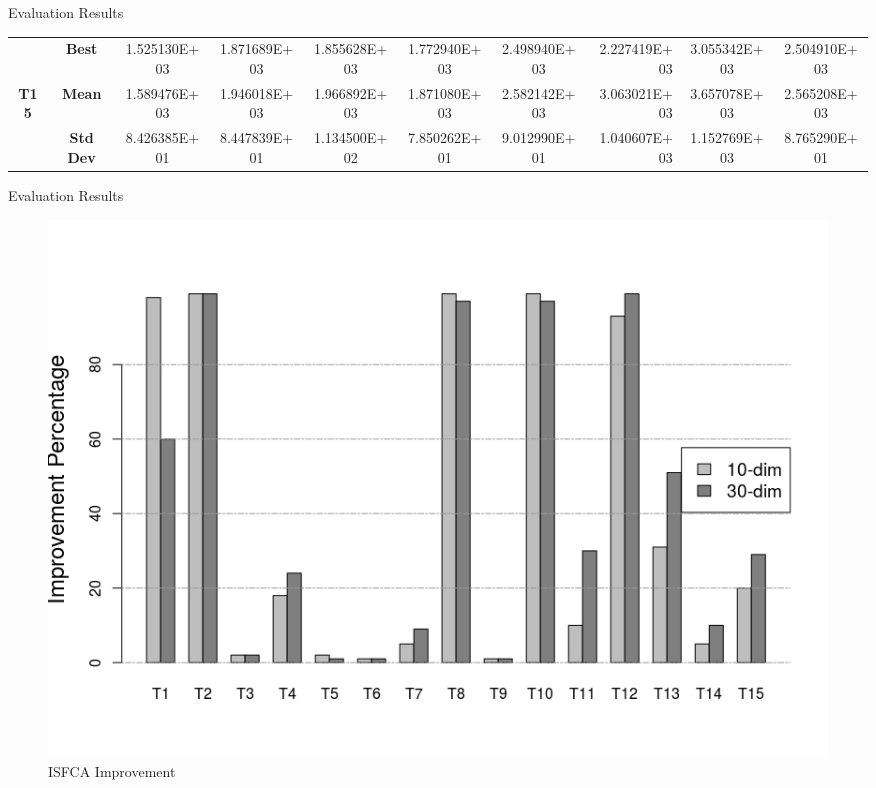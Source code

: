 \documentclass[table]{beamer}
\begin{document}
\begin{frame}{Evaluation Results}
\begin{table}[htbp]
{\begin{tabular}{|c|c|c|c|c|c|c|r|c|c|}
				\multicolumn{ 1}{|c|}{} & \textbf{Best} & 1.525130E+03 & 1.871689E+03 & 1.855628E+03 & 1.772940E+03 & 2.498940E+03 & 2.227419E+03 & 3.055342E+03 & 2.504910E+03 \\ \cline{ 2- 10}
				\multicolumn{ 1}{|c|}{\textbf{T15}} & \textbf{Mean} & 1.589476E+03 & 1.946018E+03 & 1.966892E+03 & 1.871080E+03 & 2.582142E+03 & 3.063021E+03 & 3.657078E+03 & 2.565208E+03 \\ \cline{ 2- 10}
				\multicolumn{ 1}{|c|}{} & \textbf{Std Dev} & 8.426385E+01 & 8.447839E+01 & 1.134500E+02 & 7.850262E+01 & 9.012990E+01 & 1.040607E+03 & 1.152769E+03 & 8.765290E+01 \\ \hline
			\end{tabular}}
			\label{}
		\end{table}
	\end{frame}
	
	\begin{frame}{Evaluation Results}
		\begin{figure}[v]
			\includegraphics[scale=0.43]{percent_I}
			\centering
			\caption{ISFCA Improvement}
			\label{ref:percent_i}
		\end{figure}
	\end{frame}
\end{document}
